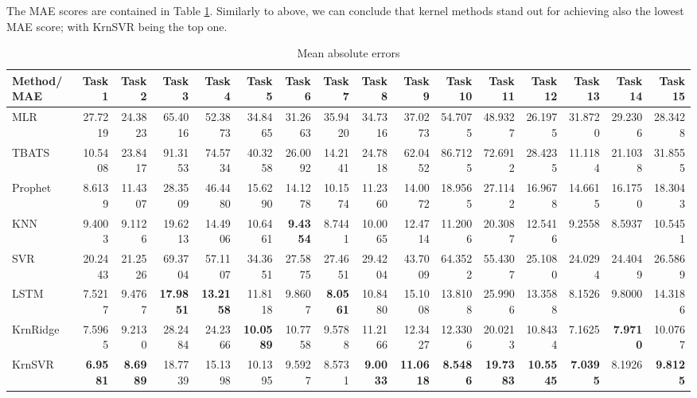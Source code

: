 The MAE scores are contained in Table \ref{tab:point_MAE}. Similarly to above, we can conclude that kernel methods stand out for achieving also the lowest MAE score; with KrnSVR being the top one.
\begin{table}[!ht]
    \caption{Mean absolute errors}
    \label{tab:point_MAE}
    \begin{adjustbox}{width=\textwidth}
        \begin{tabular}{lrrrrrrrrrrrrrrr}
            \toprule
             Method/MAE & Task 1 & Task 2 & Task 3 & Task 4 & Task 5 & Task 6 & Task 7 & Task 8 & Task 9 & Task 10 & Task 11 & Task 12 & Task 13 & Task 14 & Task 15 \\
            \midrule
            MLR & 27.7219 & 24.3823 & 65.4016 & 52.3873 & 34.8465 & 31.2663 & 35.9420 & 34.7316 & 37.0273 & 54.7075 & 48.9327 & 26.1975 & 31.8720 & 29.2306 & 28.3428 \\
            TBATS & 10.5408 & 23.8417 & 91.3153 & 74.5734 & 40.3258 & 26.0092 & 14.2141 & 24.7818 & 62.0452 & 86.7125 & 72.6912 & 28.4235 & 11.1184 & 21.1038 & 31.8555 \\
            Prophet & 8.6139 & 11.4307 & 28.3509 & 46.4480 & 15.6290 & 14.1278 & 10.1574 & 11.2360 & 14.0072 & 18.9565 & 27.1142 & 16.9678 & 14.6615 & 16.1750 & 18.3043 \\
            KNN & 9.4003 & 9.1126 & 19.6213 & 14.4906 & 10.6461 & \textbf{9.4354} & 8.7441 & 10.0065 & 12.4714 & 11.2006 & 20.3087 & 12.5416 & 9.2558 & 8.5937 & 10.5451 \\
            SVR & 20.2443 & 21.2526 & 69.3704 & 57.1107 & 34.3651 & 27.5875 & 27.4651 & 29.4204 & 43.7009 & 64.3522 & 55.4307 & 25.1080 & 24.0294 & 24.4049 & 26.5869 \\
            LSTM & 7.5217 & 9.4767 & \textbf{17.9851} & \textbf{13.2158} & 11.8118 & 9.8607 & \textbf{8.0561} & 10.8480 & 15.1008 & 13.8108 & 25.9906 & 13.3588 & 8.1526 & 9.8000 & 14.3186 \\
            KrnRidge & 7.5965 & 9.2130 & 28.2484 & 24.2366 & \textbf{10.0589} & 10.7758 & 9.5788 & 11.2166 & 12.3427 & 12.3306 & 20.0213 & 10.8434 & 7.1625 & \textbf{7.9710} & 10.0767 \\
            KrnSVR & \textbf{6.9581} & \textbf{8.6989} & 18.7739 & 15.1398 & 10.1395 & 9.5927 & 8.5731 & \textbf{9.0033} & \textbf{11.0618} & \textbf{8.5486} & \textbf{19.7383} & \textbf{10.5545} & \textbf{7.0395} & 8.1926 & \textbf{9.8125} \\
            \bottomrule
            \end{tabular}            
    \end{adjustbox}            
\end{table}

